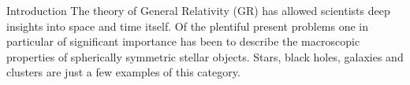 \begin{section}{Introduction}
The theory of General Relativity (GR) has allowed scientists deep insights into space and time itself.
Of the plentiful present problems one in particular of significant importance has been to describe the macroscopic properties of spherically symmetric stellar objects.
Stars, black holes, galaxies and clusters are just a few examples of this category.

\end{section}
